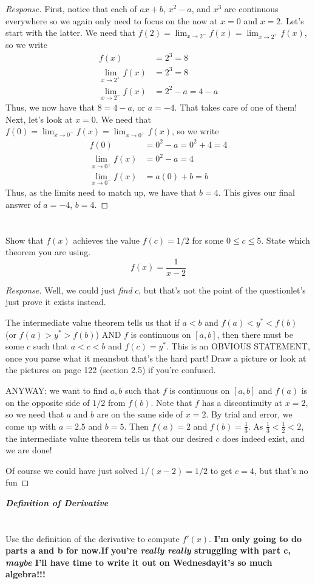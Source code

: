 \documentclass[english]{article}
\newcommand{\prob}[1]{\setcounter{section}{#1-1}\section{}}
\theoremstyle{remark}
\theoremstyle{definition}
\newcommand{\resp}[1]{\begin{proof}[Response]{#1}\end{proof}}
\begin{document}
	\resp{First, notice that each of $ax+b$, $x^2-a$, and $x^3$ are continuous everywhere so we again only need to focus on the \say{seams,} now at $x=0$ and $x=2$. Let's start with the latter. We need that $f(2)=\lim_{x\to 2^-}f(x)=\lim_{x\to 2^+}f(x)$, so we write
		\begin{align*}
			f(x)&=2^3=8\\
			\lim_{x\to 2^+}f(x)&=2^3=8\\
			\lim_{x\to 2^-}f(x)&=2^2-a=4-a
		\end{align*}
	Thus, we now have that $8=4-a$, or $a=-4$. That takes care of one of them! Next, let's look at $x=0$. We need that $f(0)=\lim_{x\to 0^-}f(x)=\lim_{x\to 0^+}f(x)$, so we write
	\begin{align*}
	f(0)&=0^2-a=0^2+4=4\\
	\lim_{x\to 0^+}f(x)&=0^2-a=4\\
	\lim_{x\to 0^-}f(x)&=a(0)+b=b
	\end{align*}
	Thus, as the limits need to match up, we have that $b=4$. This gives our final answer of $a=-4$, $b=4$.

}
	\prob{5} Show that $f(x)$ achieves the value $f(c)=1/2$ for some $0\leq c \leq 5$. State which theorem you are using.
	$$f(x)=\frac{1}{x-2}$$\resp{
Well, we could just \emph{find} $c$, but that's not the point of the question\textemdash let's just prove it exists instead.

The intermediate value theorem tells us that if $a<b$ and $f(a)<y^*<f(b)$ (or $f(a)>y^*>f(b)$) AND $f$ is continuous on $[a,b]$, then there must be some $c$ such that $a<c<b$ and $f(c)=y^*$. This is an OBVIOUS STATEMENT, once you parse what it means\textemdash but that's the hard part! Draw a picture or look at the pictures on page 122 (section 2.5) if you're confused.

ANYWAY: we want to find $a,b$ such that $f$ is continuous on $[a,b]$ and $f(a)$ is on the opposite side of $1/2$ from $f(b)$. Note that $f$ has a discontinuity at $x=2$, so we need that $a$ and $b$ are on the same side of $x=2$. By trial and error, we come up with $a=2.5$ and $b=5$. Then $f(a)=2$ and $f(b)=\frac{1}{3}$. As $\frac{1}{3}<\frac{1}{2}<2$, the intermediate value theorem tells us that our desired $c$ does indeed exist, and we are done!

Of course we could have just solved $1/(x-2)=1/2$ to get $c=4$, but that's no fun\textellipsis

}
	\begin{center}{\LARGE\textbf{\emph{Definition of Derivative}}}\end{center}
	\prob{6} Use the definition of the derivative to compute $f'(x)$.
	\textbf{I'm only going to do parts a and b for now.If you're \emph{really really} struggling with part c, \emph{maybe} I'll have time to write it out on Wednesday\textemdash it's so much algebra!!!}
	
\end{document}
